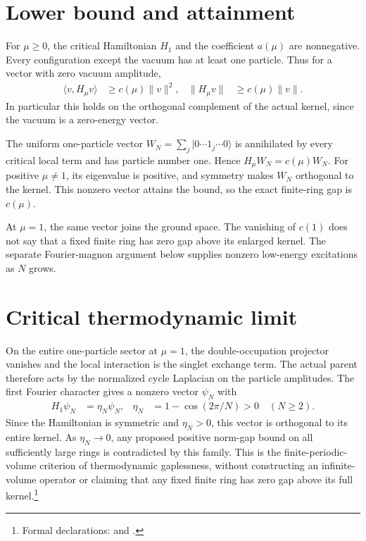 \documentclass{article}
\begin{document}
\section{Lower bound and attainment}
For $\mu\ge0$, the critical Hamiltonian $H_1$ and the coefficient $a(\mu)$
are nonnegative. Every configuration except the vacuum has at least one
particle. Thus for a vector with zero vacuum amplitude,
\begin{align}
    \langle v,H_\mu v\rangle & \ge c(\mu)\|v\|^2,
                             & \|H_\mu v\|        & \ge c(\mu)\|v\|.
    \label{eq:bn12_gap_bound}
\end{align}
In particular this holds on the orthogonal complement of the actual kernel,
since the vacuum is a zero-energy vector.

The uniform one-particle vector $W_N=\sum_j|0\cdots1_j\cdots0\rangle$
is annihilated by every critical local term and has particle number one.
Hence $H_\mu W_N=c(\mu)W_N$. For positive $\mu\ne1$, its eigenvalue is
positive, and symmetry makes $W_N$ orthogonal to the kernel. This nonzero
vector attains the bound, so the exact finite-ring gap is $c(\mu)$.

At $\mu=1$, the same vector joins the ground space. The vanishing of
$c(1)$ does not say that a fixed finite ring has zero gap above its enlarged
kernel. The separate Fourier-magnon argument below supplies nonzero low-energy
excitations as $N$ grows.

\section{Critical thermodynamic limit}
On the entire one-particle sector at $\mu=1$, the double-occupation
projector vanishes and the local interaction is the singlet exchange term.
The actual parent therefore acts by the normalized cycle Laplacian on the
particle amplitudes. The first Fourier character gives a nonzero vector
$\psi_N$ with
\begin{align}
    H_1\psi_N & =\eta_N\psi_N,
              & \eta_N         & =1-\cos(2\pi/N)>0\quad(N\ge2).
    \label{eq:bn12_critical_fourier}
\end{align}
Since the Hamiltonian is symmetric and $\eta_N>0$, this vector is
orthogonal to its entire kernel. As $\eta_N\to0$, any proposed positive
norm-gap bound on all sufficiently large rings is contradicted by this
family. This is the finite-periodic-volume criterion of thermodynamic
gaplessness, without constructing an infinite-volume operator or claiming
that any fixed finite ring has zero gap above its full kernel.\footnote{Formal
    declarations: 
    and .}
\end{document}
